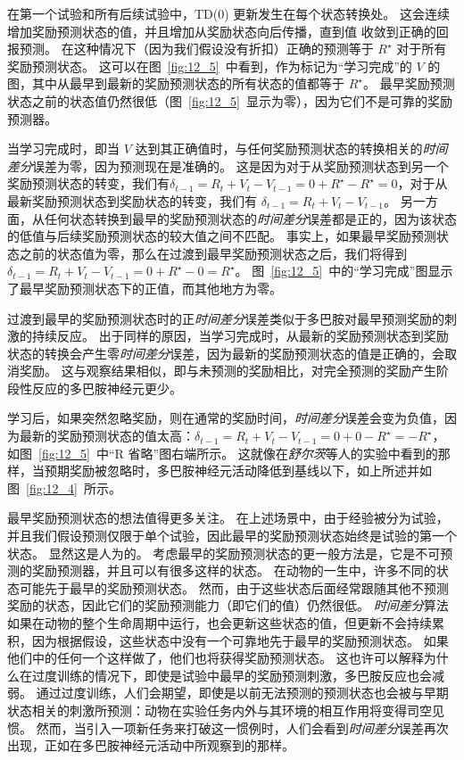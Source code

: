 在第一个试验和所有后续试验中，TD(0) 更新发生在每个状态转换处。
这会连续增加奖励预测状态的值，并且增加从奖励状态向后传播，直到值 收敛到正确的回报预测。
在这种情况下（因为我们假设没有折扣）正确的预测等于 $R^{\star}$ 对于所有奖励预测状态。
这可以在图~\ref{fig:12_5}~中看到，作为标记为“学习完成”的 $V$ 的图，其中从最早到最新的奖励预测状态的所有状态的值都等于 $R^\star$。
最早奖励预测状态之前的状态值仍然很低（图~\ref{fig:12_5}~显示为零），因为它们不是可靠的奖励预测器。


当学习完成时，即当 $V$ 达到其正确值时，与任何奖励预测状态的转换相关的\textit{时间差分}误差为零，因为预测现在是准确的。
这是因为对于从奖励预测状态到另一个奖励预测状态的转变，我们有$\delta_{t-1} = R_t + V_t - V_{t-1} = 0 + R^{\star} - R^{\star} = 0$，对于从最新奖励预测状态到奖励状态的转变，我们有 $\delta_{t-1} = R_t + V_t - V_{t-1}$。
另一方面，从任何状态转换到最早的奖励预测状态的\textit{时间差分}误差都是正的，因为该状态的低值与后续奖励预测状态的较大值之间不匹配。
事实上，如果最早奖励预测状态之前的状态值为零，那么在过渡到最早奖励预测状态之后，我们将得到 $\delta_{t-1} = R_t + V_t - V_{t-1} = 0 + R^{\star} - 0 = R^{\star}$。 
图~\ref{fig:12_5}~中的“学习完成”图显示了最早奖励预测状态下的正值，而其他地方为零。


过渡到最早的奖励预测状态时的正\textit{时间差分}误差类似于多巴胺对最早预测奖励的刺激的持续反应。
出于同样的原因，当学习完成时，从最新的奖励预测状态到奖励状态的转换会产生零\textit{时间差分}误差，因为最新的奖励预测状态的值是正确的，会取消奖励。
这与观察结果相似，即与未预测的奖励相比，对完全预测的奖励产生阶段性反应的多巴胺神经元更少。


学习后，如果突然忽略奖励，则在通常的奖励时间，\textit{时间差分}误差会变为负值，因为最新的奖励预测状态的值太高：$\delta_{t-1} = R_t + V_t - V_{t-1} = 0 + 0 - R^{\star} = -R^{\star}$，如图~\ref{fig:12_5}~中“R 省略”图右端所示。
这就像在\textit{舒尔茨}等人的实验中看到的那样\cite{schultz1993responses}，当预期奖励被忽略时，多巴胺神经元活动降低到基线以下，如上所述并如图~\ref{fig:12_4}~所示。


最早奖励预测状态的想法值得更多关注。
在上述场景中，由于经验被分为试验，并且我们假设预测仅限于单个试验，因此最早的奖励预测状态始终是试验的第一个状态。
显然这是人为的。
考虑最早的奖励预测状态的更一般方法是，它是不可预测的奖励预测器，并且可以有很多这样的状态。
在动物的一生中，许多不同的状态可能先于最早的奖励预测状态。
然而，由于这些状态后面经常跟随其他不预测奖励的状态，因此它们的奖励预测能力（即它们的值）仍然很低。
\textit{时间差分}算法如果在动物的整个生命周期中运行，也会更新这些状态的值，但更新不会持续累积，因为根据假设，这些状态中没有一个可靠地先于最早的奖励预测状态。
如果他们中的任何一个这样做了，他们也将获得奖励预测状态。
这也许可以解释为什么在过度训练的情况下，即使是试验中最早的奖励预测刺激，多巴胺反应也会减弱。
通过过度训练，人们会期望，即使是以前无法预测的预测状态也会被与早期状态相关的刺激所预测：动物在实验任务内外与其环境的相互作用将变得司空见惯。
然而，当引入一项新任务来打破这一惯例时，人们会看到\textit{时间差分}误差再次出现，正如在多巴胺神经元活动中所观察到的那样。


